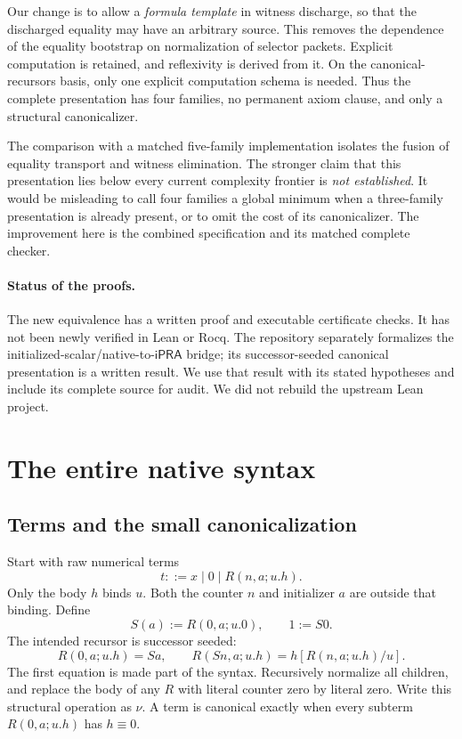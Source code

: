 \documentclass[11pt]{article}
\theoremstyle{definition}\newtheorem{definition}[theorem]{Definition}
\newcommand{\ipra}{\mathsf{iPRA}}
\newcommand{\N}{\nu}
\newcommand{\lit}{\equiv}
\begin{document}
Our change is to allow a \emph{formula template} in witness discharge,
so that the discharged equality may have an arbitrary source. This
removes the dependence of the equality bootstrap on normalization of
selector packets. Explicit computation is retained, and reflexivity is
derived from it. On the canonical-recursors basis, only one explicit
computation schema is needed. Thus the complete presentation has four
families, no permanent axiom clause, and only a structural canonicalizer.

The comparison with a matched five-family implementation isolates the
fusion of equality transport and witness elimination. The stronger
claim that this presentation lies below every current complexity
frontier is \emph{not established}. It would be misleading to call four
families a global minimum when a three-family presentation is already
present, or to omit the cost of its canonicalizer. The improvement here
is the combined specification and its matched complete checker.

\paragraph{Status of the proofs.}
The new equivalence has a written proof and executable certificate checks.
It has not been newly verified in Lean or Rocq. The repository separately
formalizes the initialized-scalar/native-to-$\ipra$ bridge; its
successor-seeded canonical presentation is a written result. We use that
result with its stated hypotheses and include its complete source for
audit. We did not rebuild the upstream Lean project.

\section{The entire native syntax}

\subsection{Terms and the small canonicalization}

Start with raw numerical terms
\[
 t ::= x\mid 0\mid R(n,a;u.h).
\]
Only the body $h$ binds $u$. Both the counter $n$ and initializer $a$
are outside that binding. Define
\[
 S(a):=R(0,a;u.0),\qquad 1:=S0.
\]
The intended recursor is successor seeded:
\[
 R(0,a;u.h)=Sa,\qquad
 R(Sn,a;u.h)=h[R(n,a;u.h)/u].
\]
The first equation is made part of the syntax. Recursively normalize
all children, and replace the body of any $R$ with literal counter zero
by literal zero. Write this structural operation as $\N$. A term is
canonical exactly when every subterm $R(0,a;u.h)$ has $h\lit0$.
\end{document}
